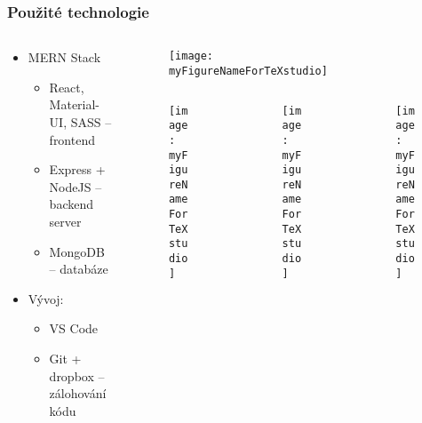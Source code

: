 \documentclass[aspectratio=43]{beamer}
\begin{document}
\begin{frame}[fragile]
	\frametitle{Použité technologie}
	\begin{columns}
		\begin{column}{0.6\textwidth}
			\begin{itemize}
				\item MERN Stack
				      \begin{itemize}
					      \item React, Material-UI, SASS -- frontend
					      \item Express + NodeJS -- backend server
					      \item MongoDB -- databáze
				      \end{itemize}
				\item Vývoj:
				      \begin{itemize}
					      \item VS Code
					      \item Git + dropbox -- zálohování kódu
				      \end{itemize}
			\end{itemize}
		\end{column}
		\begin{column}{0.4\textwidth}
			\begin{figure}[H]
				\centering {}
				\texttt{[image: \\myFigureNameForTeXstudio]}
			\end{figure}
			\begin{columns}
				\begin{column}{0.3\columnwidth}
					\begin{figure}[H]
						\centering {}
						\texttt{[image: \\myFigureNameForTeXstudio]}
					\end{figure}
				\end{column}

				\begin{column}{0.3\columnwidth}
					\begin{figure}[H]
						\centering {}
						\texttt{[image: \\myFigureNameForTeXstudio]}
					\end{figure}
				\end{column}
				\begin{column}{0.3\columnwidth}
					\begin{figure}[H]
						\centering {}
						\texttt{[image: \\myFigureNameForTeXstudio]}
					\end{figure}
				\end{column}
			\end{columns}
		\end{column}
	\end{columns}
\end{frame}
\end{document}
